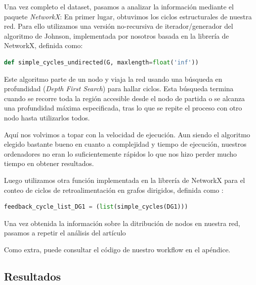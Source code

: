 \documentclass[1p]{elsarticle}
\begin{document}
    Una vez completo el dataset, pasamos a analizar la información mediante el paquete \textit{NetworkX}:
	 En primer lugar, obtuvimos los ciclos estructurales de nuestra red. Para ello utilizamos una versión no-recursiva de iterador/generador del algoritmo de Johnson, implementada por nosotros basada en la librería de NetworkX, definida como:
\begin{lstlisting}[language=Python]
    def simple_cycles_undirected(G, maxlength=float('inf'))
\end{lstlisting}
    Este algoritmo parte de un nodo y viaja la red usando una búsqueda en profundidad (\textit{Depth First Search}) para hallar ciclos. Esta búsqueda termina cuando se recorre toda la región accesible desde el nodo de partida o se alcanza una profundidad máxima especificada, tras lo que se repite el proceso con otro nodo hasta utilizarlos todos.

    Aquí nos volvimos a topar con la velocidad de ejecución.
    Aun siendo el algoritmo elegido bastante bueno en cuanto a complejidad y tiempo de ejecución, nuestros ordenadores no eran lo suficientemente rápidos lo que nos hizo perder mucho tiempo en obtener resultados.

    Luego utilizamos otra función implementada en la librería de NetworkX para el conteo de ciclos de retroalimentación en grafos dirigidos, definida como :

\begin{lstlisting}[language=Python]
    feedback_cycle_list_DG1 = (list(simple_cycles(DG1)))
\end{lstlisting}

    Una vez obtenida la información sobre la ditribución de nodos en nuestra red, pasamos a repetir el análisis del artículo 

    Como extra, puede consultar el código de nuestro workflow en el apéndice.


\subsection{Resultados}
\end{document}
